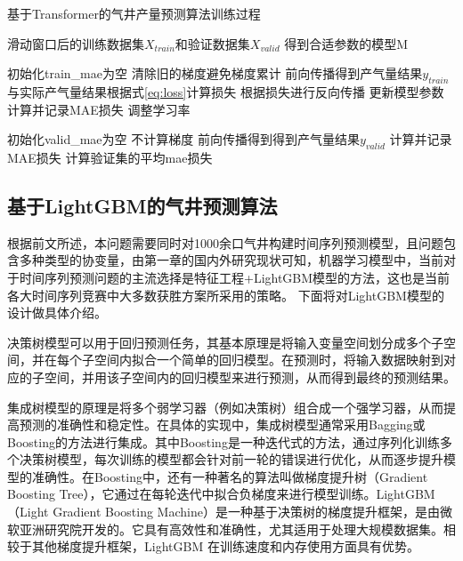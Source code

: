 \begin{algorithm}[H]
    \baselineskip=20pt
    \caption{基于Transformer的气井产量预测算法训练过程}
    \label{al:T-GRU}
    \begin{algorithmic}[1]
    \Require 滑动窗口后的训练数据集$X_{train}$和验证数据集$X_{valid}$
    \Ensure 得到合适参数的模型M

        \State 初始化train\_mae为空
            \State 清除旧的梯度避免梯度累计
            \State 前向传播得到产气量结果$y_{train}$
            \State 与实际产气量结果根据式\ref{eq:loss}计算损失
            \State 根据损失进行反向传播
            \State 更新模型参数
        \EndFor    
        \State 计算并记录MAE损失
        \State 调整学习率

        \State 初始化valid\_mae为空
            \State 不计算梯度
            \State 前向传播得到得到产气量结果$y_{valid}$
            \State 计算并记录MAE损失
        \EndFor
        \State 计算验证集的平均mae损失
    \EndFor
    \end{algorithmic}
  \end{algorithm}
\subsection{基于LightGBM的气井预测算法}
根据前文所述，本问题需要同时对1000余口气井构建时间序列预测模型，且问题包含多种类型的协变量，由第一章的国内外研究现状可知，机器学习模型中，当前对于时间序列预测问题的主流选择是特征工程+LightGBM模型的方法，这也是当前各大时间序列竞赛中大多数获胜方案所采用的策略。
下面将对LightGBM模型的设计做具体介绍。

决策树模型可以用于回归预测任务，其基本原理是将输入变量空间划分成多个子空间，并在每个子空间内拟合一个简单的回归模型。在预测时，将输入数据映射到对应的子空间，并用该子空间内的回归模型来进行预测，从而得到最终的预测结果。

集成树模型的原理是将多个弱学习器（例如决策树）组合成一个强学习器，从而提高预测的准确性和稳定性。在具体的实现中，集成树模型通常采用Bagging或Boosting的方法进行集成。其中Boosting是一种迭代式的方法，通过序列化训练多个决策树模型，每次训练的模型都会针对前一轮的错误进行优化，从而逐步提升模型的准确性。在Boosting中，还有一种著名的算法叫做梯度提升树（Gradient Boosting Tree），它通过在每轮迭代中拟合负梯度来进行模型训练。LightGBM（Light Gradient Boosting Machine）是一种基于决策树的梯度提升框架，是由微软亚洲研究院开发的。它具有高效性和准确性，尤其适用于处理大规模数据集。相较于其他梯度提升框架，LightGBM 在训练速度和内存使用方面具有优势。


